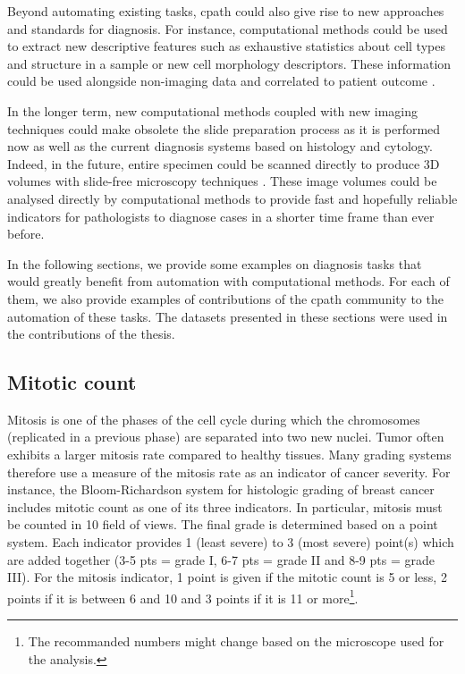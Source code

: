 Beyond automating existing tasks, \acrlong{cpath} could also give rise to new approaches and standards for diagnosis. For instance, computational methods could be used to extract new descriptive features such as exhaustive statistics about cell types and structure in a sample or new cell morphology descriptors. These information could be used alongside non-imaging data and correlated to patient outcome \parencite{abels2019computational}. 

In the longer term, new computational methods coupled with new imaging techniques could make obsolete the slide preparation process as it is performed now as well as the current diagnosis systems based on histology and cytology. Indeed, in the future, entire specimen could be scanned directly to produce 3D volumes with slide-free microscopy techniques \parencite{np2017histopathology, liu2021slide}. These image volumes could be analysed directly by computational methods to provide fast and hopefully reliable indicators for pathologists to diagnose cases in a shorter time frame than ever before.

In the following sections, we provide some examples on diagnosis tasks that would greatly benefit from automation with computational methods. For each of them, we also provide examples of contributions of the \acrlong{cpath} community to the automation of these tasks. The datasets presented in these sections were used in the contributions of the thesis. 

\subsection{Mitotic count}
\label{ssec:backdp:analysis_mitotic_count}

Mitosis is one of the phases of the cell cycle during which the chromosomes (replicated in a previous phase) are separated into two new nuclei. Tumor often exhibits a larger mitosis rate compared to healthy tissues. Many grading systems therefore use a measure of the mitosis rate as an indicator of cancer severity. For instance, the Bloom-Richardson system \parencite{roychowdhury2022bloomrichardson} for histologic grading of breast cancer includes mitotic count as one of its three indicators. In particular, mitosis must be counted in 10 field of views. The final grade is determined based on a point system. Each indicator provides 1 (least severe) to 3 (most severe) point(s) which are added together (3-5 pts = grade I, 6-7 pts = grade II and 8-9 pts = grade III). For the mitosis indicator, 1 point is given if the mitotic count is 5 or less, 2 points if it is between 6 and 10 and 3 points if it is 11 or more\footnote{The recommanded numbers might change based on the microscope used for the analysis.}. 

